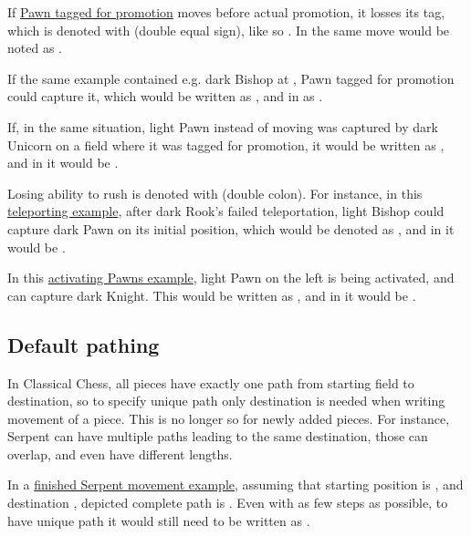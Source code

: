 If \hyperref[fig:scn_aoa_04_delayed_promo_pawn_2_tagged]{Pawn tagged for promotion} moves
before actual promotion, it losses its tag, which is denoted with \alg{==} (double equal
sign), like so . In  the same move would be noted as .

If the same example contained e.g. dark Bishop at , Pawn tagged for promotion could
capture it, which would be written as , and in  as .

If, in the same situation, light Pawn instead of moving was captured by dark Unicorn on a
field where it was tagged for promotion, it would be written as , and in
 it would be .

Losing ability to rush is denoted with \alg{::} (double colon). For instance, in this
\hyperref[fig:scn_n_03_teleport_move_2]{teleporting example}, after dark Rook's failed
teleportation, light Bishop could capture dark Pawn on its initial position, which would
be denoted as , and in  it would be .

In this \hyperref[fig:scn_mv_31_activating_rush_pawn_init]{activating Pawns example}, light
Pawn on the left is being activated, and can capture dark Knight. This would be written as
, and in  it would be
\alg{[Re6-e2]\~{}[We2-c2]\~{}[P::c2-b3*N]}.

\subsection*{Default pathing}
\label{sec:Appendix/Notation/Default pathing}

In Classical Chess, all pieces have exactly one path from starting field to destination,
so to specify unique path only destination is needed when writing movement of a piece.
This is no longer so for newly added pieces. For instance, Serpent can have multiple paths
leading to the same destination, those can overlap, and even have different lengths.

In a \hyperref[fig:scn_tr_05_serpent_end]{finished Serpent movement example}, assuming that
starting position is , and destination , depicted complete path is
. Even with as few steps as possible, to have unique path
it would still need to be written as .

